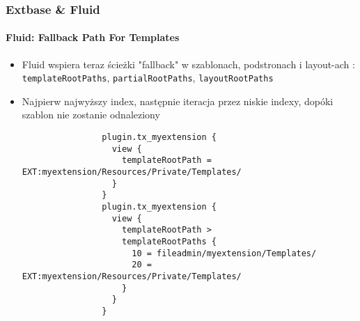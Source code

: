 \begin{frame}[fragile]
	\frametitle{Extbase \& Fluid}
	\framesubtitle{Fluid: Fallback Path For Templates}

	\lstset{
		basicstyle=\tiny\ttfamily
	}

	\begin{itemize}
		\item Fluid wspiera teraz ścieżki "fallback" w szablonach, podstronach i layout-ach :\newline
			\smaller\texttt{templateRootPaths}, \texttt{partialRootPaths}, \texttt{layoutRootPaths}\normalsize
		\item Najpierw najwyższy index, następnie iteracja przez niskie indexy, dopóki szablon nie zostanie odnaleziony

			\begin{lstlisting}
				plugin.tx_myextension {
				  view {
				    templateRootPath = EXT:myextension/Resources/Private/Templates/
				  }
				}
				plugin.tx_myextension {
				  view {
				    templateRootPath >
				    templateRootPaths {
				      10 = fileadmin/myextension/Templates/
				      20 = EXT:myextension/Resources/Private/Templates/
				    }
				  }
				}
			\end{lstlisting}

	\end{itemize}

\end{frame}


